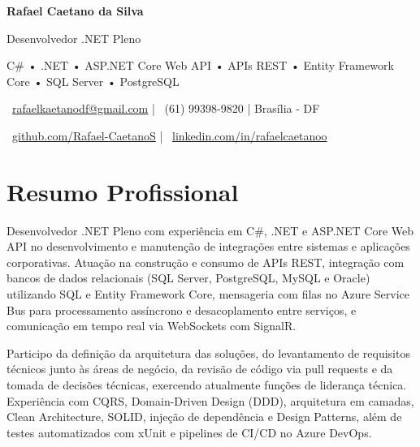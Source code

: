 \documentclass[11pt,a4paper]{article}
\begin{document}

\begin{center}

{\Huge\bfseries Rafael Caetano da Silva}

\vspace{5pt}

{\Large Desenvolvedor .NET Pleno}

\vspace{4pt}

{\small
C\# • .NET • ASP.NET Core Web API • APIs REST • Entity Framework Core • SQL Server • PostgreSQL
}

\vspace{6pt}

\small

\faEnvelope\
\href{mailto:rafaelkaetanodf@gmail.com}{rafaelkaetanodf@gmail.com}
\quad|\quad
\faPhone\
(61) 99398-9820
\quad|\quad
\faMapMarker*
Brasília - DF

\vspace{3pt}

\faGithub\
\href{https://github.com/Rafael-CaetanoS}{github.com/Rafael-CaetanoS}
\quad|\quad
\faLinkedin\
\href{https://linkedin.com/in/rafaelcaetanoo}{linkedin.com/in/rafaelcaetanoo}

\end{center}

\vspace{-0.2cm}
\section{Resumo Profissional}

Desenvolvedor .NET Pleno com experiência em C\#, .NET e ASP.NET Core Web API no desenvolvimento e manutenção de integrações entre sistemas e aplicações corporativas. Atuação na construção e consumo de APIs REST, integração com bancos de dados relacionais (SQL Server, PostgreSQL, MySQL e Oracle) utilizando SQL e Entity Framework Core, mensageria com filas no Azure Service Bus para processamento assíncrono e desacoplamento entre serviços, e comunicação em tempo real via WebSockets com SignalR.

\vspace{0.3cm}

Participo da definição da arquitetura das soluções, do levantamento de requisitos técnicos junto às áreas de negócio, da revisão de código via pull requests e da tomada de decisões técnicas, exercendo atualmente funções de liderança técnica. Experiência com CQRS, Domain-Driven Design (DDD), arquitetura em camadas, Clean Architecture, SOLID, injeção de dependência e Design Patterns, além de testes automatizados com xUnit e pipelines de CI/CD no Azure DevOps.
\end{document}
